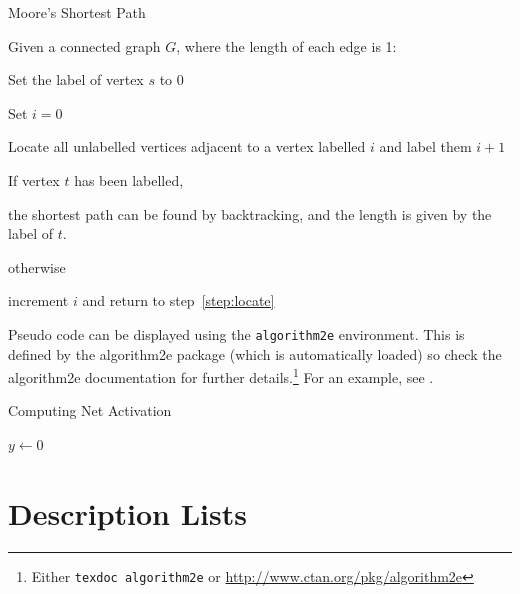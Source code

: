 \documentclass[pmlr]{jmlr}%
\begin{document}
\begin{algorithm}
\caption{Moore's Shortest Path}\label{alg:moore}
Given a connected graph $G$, where the length of each edge is 1:
\begin{enumerate*}
  \item Set the label of vertex $s$ to 0
  \item Set $i=0$
  \begin{enumerate*}
    \item \label{step:locate}Locate all unlabelled vertices 
          adjacent to a vertex labelled $i$ and label them $i+1$
    \item If vertex $t$ has been labelled,
    \begin{enumerate*}
      \item[] the shortest path can be found by backtracking, and 
      the length is given by the label of $t$.
    \end{enumerate*}
    otherwise
    \begin{enumerate*}
      \item[] increment $i$ and return to step~\ref{step:locate}
    \end{enumerate*}
  \end{enumerate*}
\end{enumerate*}
\end{algorithm}

Pseudo code can be displayed using the \texttt{algorithm2e}
environment. This is defined by the \textsf{algorithm2e} package
(which is automatically loaded) so check the \textsf{algorithm2e}
documentation for further details.\footnote{Either \texttt{texdoc
algorithm2e} or \url{http://www.ctan.org/pkg/algorithm2e}}
For an example, see .

\begin{algorithm2e}
\caption{Computing Net Activation}
\label{alg:net}
{}
$y\leftarrow 0$\;
\end{algorithm2e}

\section{Description Lists}
\end{document}
